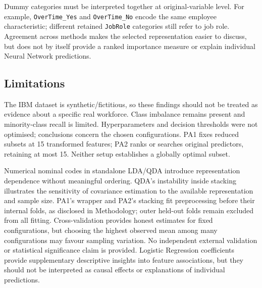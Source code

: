 Dummy categories must be interpreted together at original-variable level. For example, \texttt{OverTime\_Yes} and \texttt{OverTime\_No} encode the same employee characteristic; different retained \texttt{JobRole} categories still refer to job role. Agreement across methods makes the selected representation easier to discuss, but does not by itself provide a ranked importance measure or explain individual Neural Network predictions.

\subsection{Limitations}
The IBM dataset is synthetic/fictitious, so these findings should not be treated as evidence about a specific real workforce. Class imbalance remains present and minority-class recall is limited. Hyperparameters and decision thresholds were not optimised; conclusions concern the chosen configurations. PA1 fixes reduced subsets at 15 transformed features; PA2 ranks or searches original predictors, retaining at most 15. Neither setup establishes a globally optimal subset.

Numerical nominal codes in standalone LDA/QDA introduce representation dependence without meaningful ordering. QDA's instability inside stacking illustrates the sensitivity of covariance estimation to the available representation and sample size. PA1's wrapper and PA2's stacking fit preprocessing before their internal folds, as disclosed in Methodology; outer held-out folds remain excluded from all fitting. Cross-validation provides honest estimates for fixed configurations, but choosing the highest observed mean among many configurations may favour sampling variation. No independent external validation or statistical significance claim is provided. Logistic Regression coefficients provide supplementary descriptive insights into feature associations, but they should not be interpreted as causal effects or explanations of individual predictions.

